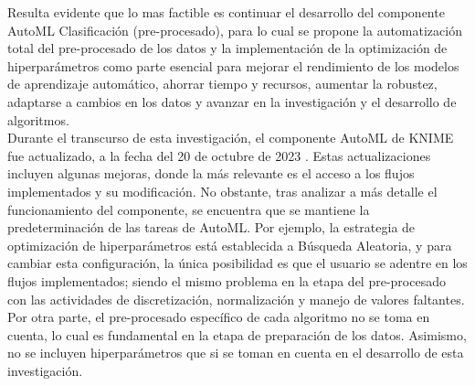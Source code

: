 \begin{table}[H]
\end{table}

Resulta evidente que lo mas factible es continuar el desarrollo del componente AutoML Clasificación (pre-procesado), para lo cual se propone la automatización total del pre-procesado de los datos y la implementación de la optimización de hiperparámetros como parte esencial para mejorar el rendimiento de los modelos de aprendizaje automático, ahorrar tiempo y recursos, aumentar la robustez, adaptarse a cambios en los datos y avanzar en la investigación y el desarrollo de algoritmos.\\
Durante el transcurso de esta investigación, el componente AutoML de KNIME fue actualizado, a la fecha del 20 de octubre de 2023 \citep{KNIME2023-11}. Estas actualizaciones incluyen algunas mejoras, donde la más relevante es el acceso a los flujos implementados y su modificación. No obstante, tras analizar a más detalle el funcionamiento del componente, se encuentra que se mantiene la predeterminación de las tareas de AutoML. Por ejemplo, la estrategia de optimización de hiperparámetros está establecida a Búsqueda Aleatoria, y para cambiar esta configuración, la única posibilidad es que el usuario se adentre en los flujos implementados; siendo el mismo problema en la etapa del pre-procesado con las actividades de discretización, normalización y manejo de valores faltantes. Por otra parte, el pre-procesado específico de cada algoritmo no se toma en cuenta, lo cual es fundamental en la etapa de preparación de los datos. Asimismo, no se incluyen hiperparámetros que si se toman en cuenta en el desarrollo de esta investigación.


